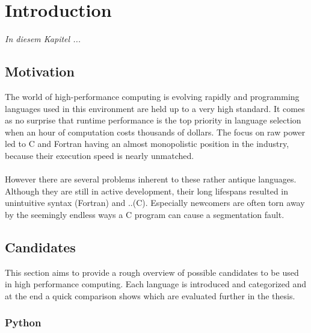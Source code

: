 \chapter{Introduction}
\label{chap:Introduction}

\textit{%
In diesem Kapitel ...
}
\bigskip

\section{Motivation}
\label{sec:Motivation}

The world of high-performance computing is evolving rapidly and programming languages used in this environment are held up to a very high standard. It comes as no surprise that runtime performance is the top priority in language selection when an hour of computation costs thousands of dollars. The focus on raw power led to C and Fortran having an almost monopolistic position in the industry, because their execution speed is nearly unmatched.
\\ \\
However there are several problems inherent to these rather antique languages. Although they are still in active development, their long lifespans resulted in unintuitive syntax (Fortran) and ..(C). Especially newcomers are often torn away by the seemingly endless ways a C program can cause a segmentation fault.

\section{Candidates}
\label{sec:Candidates}

This section aims to provide a rough overview of possible candidates to be used in high performance computing. Each language is introduced and categorized and at the end a quick comparison shows which are evaluated further in the thesis.

\subsection*{Python}
\label{ssec:Candidates.Python}

